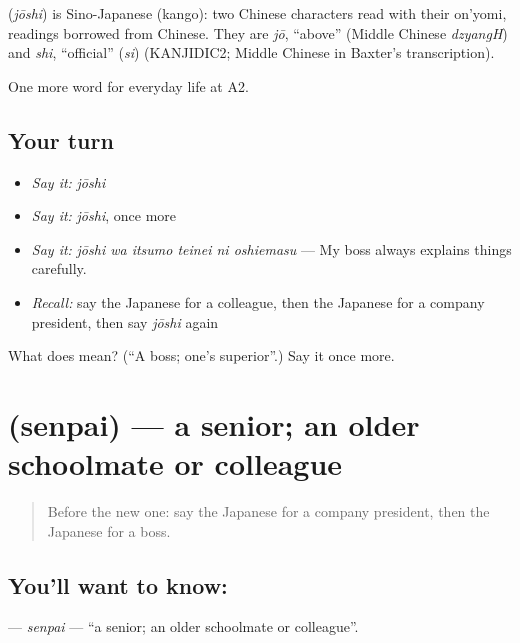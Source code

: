 \begin{cousinweb}
\textbf{} (\emph{jōshi}) is Sino-Japanese (kango): two Chinese characters read with their on'yomi, readings borrowed from Chinese. They are \emph{jō}, \textquotedblleft{}above\textquotedblright{} (Middle Chinese \emph{dzyangH}) and \emph{shi}, \textquotedblleft{}official\textquotedblright{} (\emph{si}) (KANJIDIC2; Middle Chinese in Baxter's transcription).
\end{cousinweb}

\begin{grammarlens}[title={What you've built}]
One more word for everyday life at A2.
\end{grammarlens}

\subsection*{Your turn}
\begin{itemize}
\raggedright
  \item \emph{Say it:} \emph{jōshi}
  \item \emph{Say it:} \emph{jōshi}, once more
  \item \emph{Say it:} \emph{jōshi wa itsumo teinei ni oshiemasu} — My boss always explains things carefully.
  \item \emph{Recall:} say the Japanese for a colleague, then the Japanese for a company president, then say \emph{jōshi} again
\end{itemize}

\begin{tcolorbox}[breakable,colback=teal!4,colframe=teal!35!black,title={Before you move on}]
What does  mean? (\textquotedblleft{}A boss; one's superior\textquotedblright{}.) Say it once more.
\end{tcolorbox}
\section[\texorpdfstring{\ja{せんぱい} (senpai)}{せんぱい (senpai)}]{ (senpai) — a senior; an older schoolmate or colleague}

\label{lesson:JA-C230-senpai}



\begin{quote}
Before the new one: say the Japanese for a company president, then the Japanese for a boss.
\end{quote}

\subsection*{You'll want to know: }
\textbf{} — \emph{senpai} — \textquotedblleft{}a senior; an older schoolmate or colleague\textquotedblright{}.

